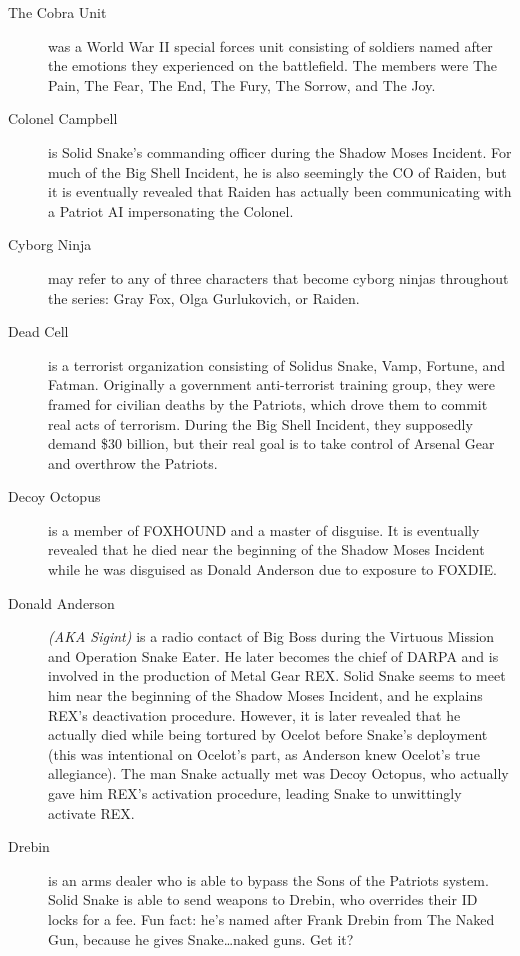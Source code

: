 \documentclass[12pt]{article}
\begin{document}
\begin{description}
	\item [The Cobra Unit] was a World War II special forces unit
		consisting of soldiers named after the emotions they
		experienced on the battlefield. The members were The Pain, The
		Fear, The End, The Fury, The Sorrow, and The Joy.

	\item [Colonel Campbell] is Solid Snake's commanding officer during the
		Shadow Moses Incident. For much of the Big Shell Incident, he
		is also seemingly the CO of Raiden, but it is eventually
		revealed that Raiden has actually been communicating with a
		Patriot AI impersonating the Colonel.

	\item [Cyborg Ninja] may refer to any of three characters that become
		cyborg ninjas throughout the series: Gray Fox, Olga
		Gurlukovich, or Raiden.

	\item [Dead Cell] is a terrorist organization consisting of Solidus
		Snake, Vamp, Fortune, and Fatman. Originally a government
		anti-terrorist training group, they were framed for civilian
		deaths by the Patriots, which drove them to commit real acts of
		terrorism. During the Big Shell Incident, they supposedly
		demand \$30 billion, but their real goal is to take control of
		Arsenal Gear and overthrow the Patriots.
		
	\item [Decoy Octopus] is a member of FOXHOUND and a master of disguise.
		It is eventually revealed that he died near the beginning of
		the Shadow Moses Incident while he was disguised as Donald
		Anderson due to exposure to FOXDIE.

	\item [Donald Anderson] \textit{(AKA Sigint)} is a radio contact of Big
		Boss during the Virtuous Mission and Operation Snake Eater. He
		later becomes the chief of DARPA and is involved in the
		production of Metal Gear REX. Solid Snake seems to meet him
		near the beginning of the Shadow Moses Incident, and he
		explains REX's deactivation procedure. However, it is later
		revealed that he actually died while being tortured by Ocelot
		before Snake's deployment (this was intentional on Ocelot's
		part, as Anderson knew Ocelot's true allegiance). The man Snake
		actually met was Decoy Octopus, who actually gave him REX's
		activation procedure, leading Snake to unwittingly activate
		REX.

	\item [Drebin] is an arms dealer who is able to bypass the Sons of the
		Patriots system. Solid Snake is able to send weapons to Drebin,
		who overrides their ID locks for a fee. Fun fact: he's named
		after Frank Drebin from The Naked Gun, because he gives
		Snake\ldots naked guns. Get it?


\end{description}
\end{document}
